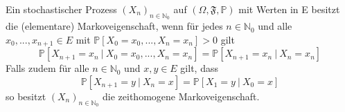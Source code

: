 Ein stochastischer Prozess $(X_{n})_{n \in \mathbb{N}_{0}}$ auf $(\Omega, \mathfrak{F}, \mathbb{P})$ mit Werten in E besitzt die (elementare) Markoveigenschaft, wenn für jedes $n \in \mathbb{N}_{0}$ und alle $x_{0},...,x_{n+1} \in E$ mit $\mathbb{P}[X_{0} = x_{0},...,X_{n} = x_{n}]>0$ gilt
\begin{equation*}
\mathbb{P}[X_{n+1} = x_{n} \: | \: X_{0} = x_{0},...,X_{n} = x_{n}] = \mathbb{P}[X_{n+1} = x_{n} \: | \: X_{n} = x_{n}] 
\end{equation*}
Falls zudem für alle $n \in \mathbb{N}_{0}$ und $x,y \in E$ gilt, dass
\begin{equation*}
\mathbb{P}[X_{n+1} = y \: | \: X_{n} = x] = \mathbb{P}[X_{1} = y \: | \: X_{0} = x]
\end{equation*}
so besitzt $(X_{n})_{n \in \mathbb{N}_{0}}$ die zeithomogene Markoveigenschaft.